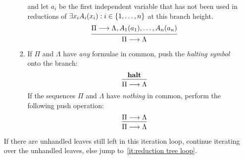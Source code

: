 \documentclass[11pt,a4paper]{article}
\begin{document}
\begin{definition}
\begin{enumerate}
\begin{enumerate}
\begin{enumerate}
                            and let \(a_i\) be the first independent variable that has not
                            been used in reductions of
                            \(\exists x_iA_i(x_i) : i \in\{1,\ldots,n\}\)
                            at this branch height.
                            \begin{equation}
                                \begin{prooftree}
                                    \tag{reduction:\(\exists\):right}
                                    \label{eq:reduction:exists:right}
                                    \hypo{\Pi\seq\Lambda,A_1(a_1),\ldots,A_n(a_n)}
                                    \infer1{\Pi\seq\Lambda}
                                \end{prooftree}
                            \end{equation}
                        \item\label{it:reduction tree else}
                            If \(\Pi\) and \(\Lambda\) have \emph{any} formulae in common,
                            push the \emph{halting symbol} \halt{} onto the branch:
                            \begin{equation}
                                \begin{prooftree}
                                    \tag{reduction:halt}
                                    \label{eq:reduction:halt}
                                    \hypo{\halt}
                                    \infer1{\Pi\seq\Lambda}
                                \end{prooftree}
                            \end{equation}
                            If the sequences \(\Pi\) and \(\Lambda\) have \emph{nothing}
                            in common, perform the following push operation:
                            \begin{equation}
                                \begin{prooftree}
                                    \tag{reduction:else}
                                    \label{eq:reduction:else}
                                    \hypo{\Pi\seq\Lambda}
                                    \infer1{\Pi\seq\Lambda}
                                \end{prooftree}
                            \end{equation}
                    \end{enumerate}
            \end{enumerate}
            If there are unhandled leaves still left in this iteration loop,
            continue iterating over the unhandled leaves, else jump
            to~\ref{it:reduction tree loop}.
    \end{enumerate}
\end{definition}
\end{document}
